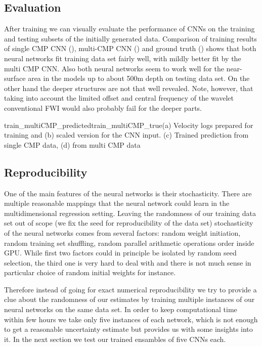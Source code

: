 \documentclass[paper,twocolomn]{geophysics}
\begin{document}

\subsection{Evaluation}
After training we can visually evaluate the performance of CNNs on the training and testing subsets of the initially generated data. Comparison of training results of single CMP CNN (), multi-CMP CNN () and ground truth () shows that both neural networks fit training data set fairly well, with mildly better fit by the multi CMP CNN. Also both neural networks seem to work well for the near-surface area in the models up to about 500m depth on testing data set. On the other hand the deeper structures are not that well revealed. Note, however, that taking into account the limited offset and central frequency of the wavelet conventional FWI would also probably fail for the deeper parts. %

{train_multiCMP_predicted}{train_multiCMP_true}{(a) Velocity logs prepared for training and (b) scaled version for the CNN input. (c) Trained prediction from single CMP data, (d) from multi CMP data}

\subsection{Reproducibility}
One of the main features of the neural networks is their stochasticity. There are multiple reasonable mappings that the neural network could learn in the multidimensional regression setting. Leaving the randomness of our training data set out of scope (we fix the seed for reproducibility of the data set) stochasticity of the neural networks comes from several factors: random weight initiation, random training set shuffling, random parallel arithmetic operations order inside GPU. While first two factors could in principle be isolated by random seed selection, the third one is very hard to deal with and there is not much sense in particular choice of random initial weights for instance.

Therefore instead of going for exact numerical reproducibility we try to provide a clue about the randomness of our estimates by training multiple instances of our neural networks on the same data set. In order to keep computational time within few hours we take only five instances of each network, which is not enough to get a reasonable uncertainty estimate but provides us with some insights into it. In the next section we test our trained ensambles of five CNNs each.
\end{document}
